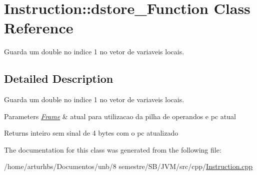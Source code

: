 \hypertarget{classInstruction_1_1dstore__1Function}{}\section{Instruction\+:\+:dstore\+\_\+Function Class Reference}
\label{classInstruction_1_1dstore__1Function}


Guarda um double no indice 1 no vetor de variaveis locais.  




\subsection{Detailed Description}
Guarda um double no indice 1 no vetor de variaveis locais. 


\begin{DoxyParams}{Parameters}
{\em \hyperlink{classFrame}{Frame}} & atual para utilizacao da pilha de operandos e pc atual \\
\hline
\end{DoxyParams}
\begin{DoxyReturn}{Returns}
inteiro sem sinal de 4 bytes com o pc atualizado 
\end{DoxyReturn}


The documentation for this class was generated from the following file\+:\begin{DoxyCompactItemize}
\item 
/home/arturhbs/\+Documentos/unb/8 semestre/\+S\+B/\+J\+V\+M/src/cpp/\hyperlink{Instruction_8cpp}{Instruction.\+cpp}\end{DoxyCompactItemize}
